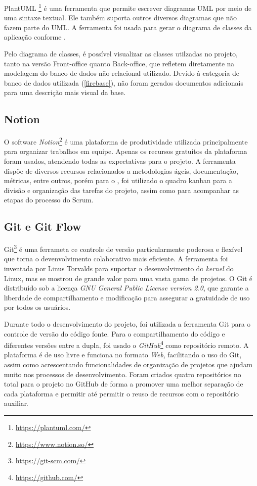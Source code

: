 PlantUML \footnote{\url{https://plantuml.com/}} é uma ferramenta que permite escrever diagramas UML por meio de uma sintaxe textual. Ele também suporta outros diversos diagramas que não fazem parte do UML. A ferramenta foi usada para gerar o diagrama de classes da aplicação conforme .


Pelo diagrama de classes, é possível visualizar as classes utilzadas no projeto, tanto na versão Front-office quanto Back-office, que refletem diretamente na modelagem do banco de dados não-relacional utilizado. Devido à categoria de banco de dados utilizada (\ref{firebase}), não foram gerados documentos adicionais para uma descrição mais visual da base.

\subsection{Notion}
\label{notion}

O software \textit{Notion}\footnote{\url{https://www.notion.so/}} é uma plataforma de produtividade utilizada principalmente para organizar trabalhos em equipe. Apenas os recursos gratuitos da plataforma foram usados, atendendo todas as expectativas para o projeto. A ferramenta dispõe de diversos recursos relacionados a metodologias ágeis, documentação, métricas, entre outros, porém para o \appName, foi utilizado o quadro kanban para a divisão e organização das tarefas do projeto, assim como para acompanhar as etapas do processo do Scrum.

\subsection{Git e Git Flow}
\label{git}

Git\footnote{\url{https://git-scm.com/}} \cite{git} é uma ferrameta ce controle de versão particularmente poderosa e flexível que torna o devenvolvimento colaborativo mais eficiente. A ferramenta foi inventada por Linus Torvalds para suportar o desenvolvimento do \textit{kernel} do Linux, mas se mostrou de grande valor para uma vasta gama de projetos. O Git é distribuído sob a licença \textit{GNU General Public License version 2.0}, que garante a liberdade de compartilhamento e modificação para assegurar a gratuidade de uso por todos os usuários.

Durante todo o desenvolvimento do projeto, foi utilizada a ferramenta Git para o controle de versão do código fonte. Para o compartilhamento do código e diferentes versões entre a dupla, foi usado o \textit{GitHub}\footnote{\url{https://github.com/}} como repositório remoto. A plataforma é de uso livre e funciona no formato \textit{Web}, facilitando o uso do Git, assim como acrescentando funcionalidades de organização de projetos que ajudam muito nos processos de desenvolvimento. Foram criados quatro repositórios no total para o projeto no GitHub de forma a promover uma melhor separação de cada plataforma e permitir até permitir o reuso de recursos com o repositório auxiliar.

